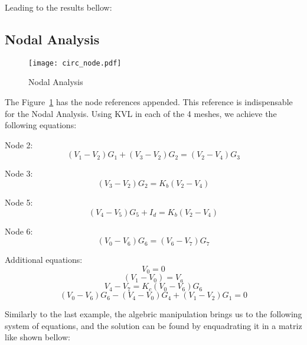 \vspace{0.5cm}

Leading to the results bellow:

\vspace{0.5cm}


\vspace{1.0cm}

\newpage

\subsection{Nodal Analysis}

\vspace{0.5cm}

\begin{figure}[h!] \centering
	\texttt{[image: circ\_node.pdf]}
	\caption{Nodal Analysis}
	\label{fig:circuitNodes}
\end{figure}

\vspace{0.5cm}

The Figure~\ref{fig:circuitNodes} has the node references appended.
This reference is indispensable for the Nodal Analysis.
Using KVL in each of the 4 meshes, we achieve the following equations:

\vspace{0.5cm}

Node 2:
$$ (V_1 - V_2)G_1 + (V_3 - V_2)G_2 = (V_2 - V_4)G_3 $$

Node 3:
$$ (V_3 - V_2)G_2 = K_b(V_2 - V_4) $$

Node 5:
$$ (V_4 - V_5)G_5 + I_d = K_b(V_2 - V_4) $$

Node 6:
$$ (V_0 - V_6)G_6 = (V_6 - V_7)G_7 $$

Additional equations:
$$ V_0 = 0 $$
$$ (V_1 - V_0) = V_a $$
$$ V_4 - V_7 = K_c(V_0 - V_6)G_6$$
$$ (V_0 -V_6)G_6 - (V_4 - V_0)G_4 + (V_1 - V_2)G_1 = 0 $$

\vspace{0.5cm}

Similarly to the last example, the algebric manipulation brings us to the following system of equations, 
and the solution can be found by enquadrating it in a matriz like shown bellow:

